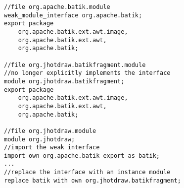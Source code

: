 \begin{lstlisting}[caption=Weak Interfaces]
//file org.apache.batik.module
weak_module_interface org.apache.batik;
export package 
	org.apache.batik.ext.awt.image,
	org.apache.batik.ext.awt,	
	org.apache.batik;

//file org.jhotdraw.batikfragment.module
//no longer explicitly implements the interface
module org.jhotdraw.batikfragment;
export package 
	org.apache.batik.ext.awt.image,
	org.apache.batik.ext.awt, 
	org.apache.batik;
	
//file org.jhotdraw.module
module org.jhotdraw;
//import the weak interface 
import own org.apache.batik export as batik;
...
//replace the interface with an instance module
replace batik with own org.jhotdraw.batikfragment; 
\end{lstlisting}

%









